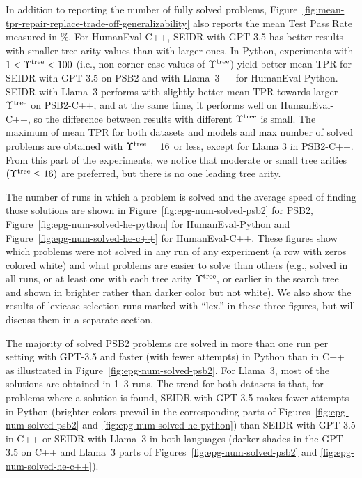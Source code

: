 In addition to reporting the number of fully solved problems, Figure~\ref{fig:mean-tpr-repair-replace-trade-off-generalizability} also reports the mean Test Pass Rate measured in \%. 
For HumanEval-C++, SEIDR with GPT-3.5 has better results with smaller tree arity values than with larger ones.
In Python, experiments with $1 < \Upsilon^\text{tree} < 100$ (i.e., non-corner case values of $\Upsilon^\text{tree}$) yield better mean TPR for SEIDR with GPT-3.5 on PSB2 and with Llama~3 --- for HumanEval-Python.
SEIDR with Llama~3 performs with slightly better mean TPR towards larger $\Upsilon^\text{tree}$  on PSB2-C++, and at the same time, it performs well on HumanEval-C++, so the difference between results with different $\Upsilon^\text{tree}$ is small.
The maximum of mean TPR for both datasets and models and max number of solved problems are obtained with $\Upsilon^\text{tree}=16$ or less, except for Llama 3 in PSB2-C++. 
From this part of the experiments, we notice that moderate or small tree arities $(\Upsilon^\text{tree} \le 16)$ are preferred, but there is no one leading tree arity.


The number of runs in which a problem is solved and the average speed of finding those solutions are shown in Figure~\ref{fig:epg-num-solved-psb2} for PSB2, Figure~\ref{fig:epg-num-solved-he-python}
for HumanEval-Python and Figure~\ref{fig:epg-num-solved-he-c++} for HumanEval-C++.
These figures show which problems were not solved in any run of any experiment (a row with zeros colored white) and what problems are easier to solve than others (e.g., solved in all runs, or at least one with each tree arity $\Upsilon^\text{tree},$ or earlier in the search tree and shown in brighter rather than darker color but not white). 
We also show the results of lexicase selection runs marked with ``lex.'' in these three figures, but will discuss them in a separate section. 

The majority of solved PSB2 problems are solved in more than one run per setting with GPT-3.5 and faster (with fewer attempts) in Python than in C++ as illustrated in Figure~\ref{fig:epg-num-solved-psb2}.
For Llama~3, most of the solutions are obtained in 1--3 runs.
The trend for both datasets is that, for problems where a solution is found, SEIDR with GPT-3.5 makes fewer attempts in Python (brighter colors prevail in the corresponding parts of Figures~\ref{fig:epg-num-solved-psb2} and~\ref{fig:epg-num-solved-he-python}) than SEIDR with GPT-3.5 in C++ or SEIDR with Llama~3 in both languages (darker shades in the GPT-3.5 on C++ and Llama~3 parts of Figures~\ref{fig:epg-num-solved-psb2} and \ref{fig:epg-num-solved-he-c++}).



